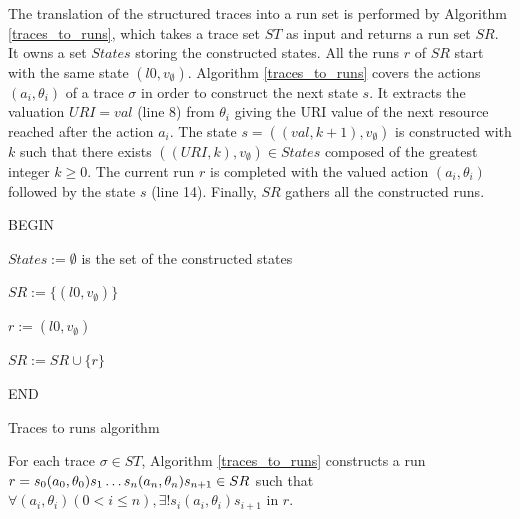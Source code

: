 The translation of the structured traces into a run set is
performed by Algorithm \ref{traces_to_runs}, which takes a
trace set $ST$ as input and returns a run set $SR$. It owns a
set $States$ storing the constructed states. All the runs $r$ of
$SR$ start with the same state $(l0,v_\emptyset)$. Algorithm
\ref{traces_to_runs} covers the actions $(a_i,\theta_i)$ of a
trace $\sigma$ in order to construct the next state $s$. It
extracts the valuation $URI=val$ (line 8) from $\theta_i$ giving
the URI value of the next resource reached after the action
$a_i$. The state $s=((val,k+1),v_\emptyset)$ is constructed with
$k$ such that there exists $((URI,k),v_\emptyset) \in States$
composed of the greatest integer $k \geq 0$. The current run $r$
is completed with the valued action $(a_i,\theta_i)$ followed by
the state $s$ (line 14). Finally, $SR$ gathers all the
constructed runs.

\begin{algorithm}
 


BEGIN\;

$States:=\emptyset$ is the set of the constructed states\;

 {
$SR:= \{(l0,v_\emptyset)\}$}

 {
$r:= (l0,v_\emptyset)$\;


$SR:=SR \cup \{r\}$

}%

END\;

    \caption{Traces to runs algorithm}
    \label{traces_to_runs}
\end{algorithm}

\begin{proposition}
For each trace $\sigma \in ST$, Algorithm \ref{traces_to_runs}
constructs a run $r=s_0(a_0,\theta_0)s_1 \dots
\\s_n(a_n,\theta_n)s_{n+1} \in SR$ such that $\forall
(a_i,\theta_i) ( 0<i\leq n), \exists ! s_i(a_i,\theta_i)s_{i+1}$
in $r$.
\end{proposition}

